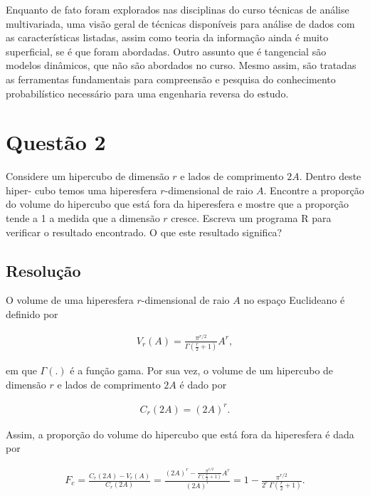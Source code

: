 \documentclass[
  a4paperpaper,
  DIV=11,
  numbers=noendperiod]{scrartcl}
\begin{document}
Enquanto de fato foram explorados nas disciplinas do curso técnicas de
análise multivariada, uma visão geral de técnicas disponíveis para
análise de dados com as características listadas, assim como teoria da
informação ainda é muito superficial, se é que foram abordadas. Outro
assunto que é tangencial são modelos dinâmicos, que não são abordados no
curso. Mesmo assim, são tratadas as ferramentas fundamentais para
compreensão e pesquisa do conhecimento probabilístico necessário para
uma engenharia reversa do estudo.

\newpage{}

\section{Questão 2}\label{questuxe3o-2}

Considere um hipercubo de dimensão \(r\) e lados de comprimento \(2A\).
Dentro deste hiper- cubo temos uma hiperesfera \(r\)-dimensional de raio
\(A\). Encontre a proporção do volume do hipercubo que está fora da
hiperesfera e mostre que a proporção tende a 1 a medida que a dimensão
\(r\) cresce. Escreva um programa R para verificar o resultado
encontrado. O que este resultado significa?

\subsection{Resolução}\label{resoluuxe7uxe3o}

O volume de uma hiperesfera \(r\)-dimensional de raio \(A\) no espaço
Euclideano é definido por

\begin{align}
    V_r(A) = \frac{\pi^{r/2}}{\Gamma\left(\frac{r}{2} + 1\right)} A^r,
\end{align}

\noindent em que \(\Gamma(.)\) é a função gama. Por sua vez, o volume de
um hipercubo de dimensão \(r\) e lados de comprimento \(2A\) é dado por

\begin{align}
    C_r(2A) = (2A)^r.
\end{align}

Assim, a proporção do volume do hipercubo que está fora da hiperesfera é
dada por

\begin{align}
    F_c = \frac{C_r(2A) - V_r(A)}{C_r(2A)} = \frac{(2A)^r - \frac{\pi^{r/2}}{\Gamma\left(\frac{r}{2} + 1\right)} A^r}{(2A)^r} = 1- \frac{\pi^{r/2}}{2^r \, \Gamma\left(\frac{r}{2} + 1\right)}.
\end{align}
\end{document}
